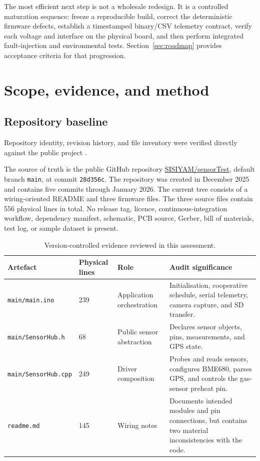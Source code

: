 \documentclass[11pt,a4paper]{article}
\newcommand{\code}[1]{\texttt{#1}}
\newcommand{\repo}{\href{https://github.com/SISIYAM/sensorTest}{SISIYAM/sensorTest}}
\begin{document}
The most efficient next step is not a wholesale redesign. It is a controlled maturation sequence: freeze a reproducible build, correct the deterministic firmware defects, establish a timestamped binary/CSV telemetry contract, verify each voltage and interface on the physical board, and then perform integrated fault-injection and environmental tests. Section~\ref{sec:roadmap} provides acceptance criteria for that progression.

\section{Scope, evidence, and method}

\subsection{Repository baseline}

Repository identity, revision history, and file inventory were verified directly against the public project \cite{repo}.

The source of truth is the public GitHub repository \repo, default branch \code{main}, at commit \code{28d356c}. The repository was created in December 2025 and contains five commits through January 2026. The current tree consists of a wiring-oriented README and three firmware files. The three source files contain 556 physical lines in total. No release tag, licence, continuous-integration workflow, dependency manifest, schematic, PCB source, Gerber, bill of materials, test log, or sample dataset is present.

\begin{table}[H]
\centering
\caption{Version-controlled evidence reviewed in this assessment.}
\label{tab:repo}
\begin{tabularx}{\textwidth}{P{0.25\textwidth}P{0.14\textwidth}P{0.14\textwidth}Y}
\toprule
Artefact & Physical lines & Role & Audit significance\\
\midrule
\code{main/main.ino} & 239 & Application orchestration & Initialisation, cooperative schedule, serial telemetry, camera capture, and SD transfer.\\
\code{main/SensorHub.h} & 68 & Public sensor abstraction & Declares sensor objects, pins, measurements, and GPS state.\\
\code{main/SensorHub.cpp} & 249 & Driver composition & Probes and reads sensors, configures BME680, parses GPS, and controls the gas-sensor preheat pin.\\
\code{readme.md} & 145 & Wiring notes & Documents intended modules and pin connections, but contains two material inconsistencies with the code.\\
\bottomrule
\end{tabularx}
\end{table}
\end{document}
